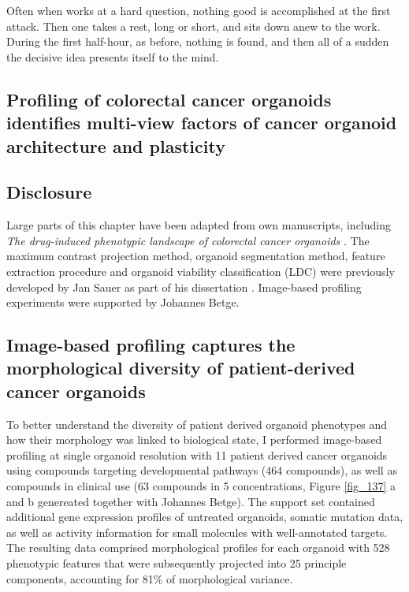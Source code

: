 \begin{savequote}[75mm]
Often when works at a hard question, nothing good is accomplished at the first attack. Then one takes a rest, long or short, and sits down anew to the work. During the first half-hour, as before, nothing is found, and then all of a sudden the decisive idea presents itself to the mind.
\end{savequote}

\begin{flushleft}
\chapter{Profiling of colorectal cancer organoids identifies multi-view factors of cancer organoid architecture and plasticity}


\section{Disclosure}
Large parts of this chapter have been adapted from own manuscripts, including \textit{The drug-induced phenotypic landscape of colorectal cancer organoids} \cite{Betge2022-kr}. The maximum contrast projection method, organoid segmentation method, feature extraction procedure and organoid viability classification (LDC) were previously developed by Jan Sauer as part of his dissertation \cite{noauthor_undated-ij}. Image-based profiling experiments were supported by Johannes Betge. 

\section{Image-based profiling captures the morphological diversity of patient-derived cancer organoids}

To better understand the diversity of patient derived organoid phenotypes and how their morphology was linked to biological state, I performed image-based profiling at single organoid resolution with 11 patient derived cancer organoids using compounds targeting developmental pathways (464 compounds), as well as compounds in clinical use (63 compounds in 5 concentrations, Figure \ref{fig_137} a and b genereated together with Johannes Betge). The support set contained additional gene expression profiles of untreated organoids, somatic mutation data, as well as activity information for small molecules with well-annotated targets. The resulting data comprised morphological profiles for each organoid with 528 phenotypic features  that were subsequently projected into 25 principle components, accounting for 81\% of morphological variance. 


\end{flushleft}
